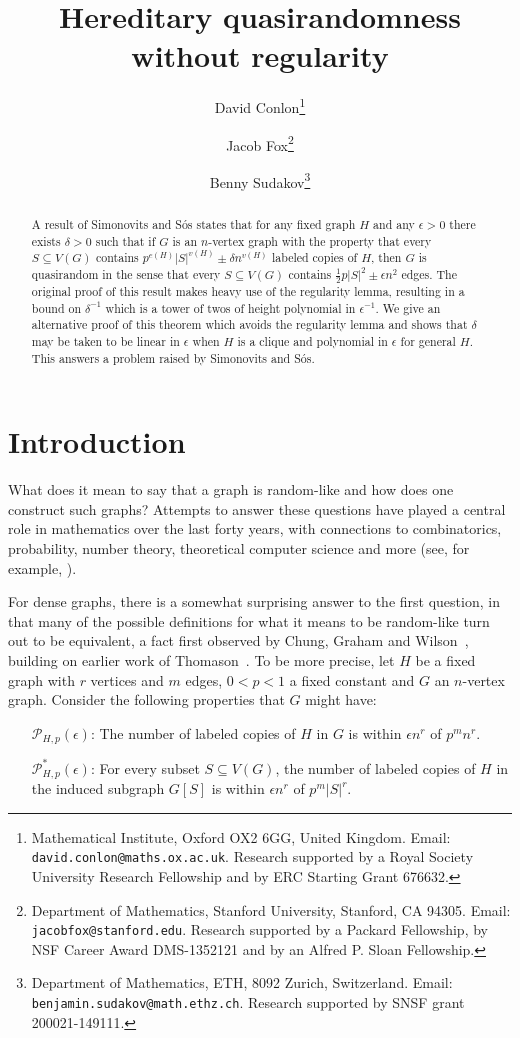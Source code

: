 \documentclass[11pt]{article}
\title{\vspace{-0.7cm}Hereditary quasirandomness without regularity}
\author{David Conlon\thanks{Mathematical Institute, Oxford OX2 6GG,
United Kingdom. Email: {\tt david.conlon@maths.ox.ac.uk}. Research
supported by a Royal Society University Research Fellowship and by ERC Starting Grant 676632.}\and
Jacob Fox\thanks{Department of Mathematics, Stanford University, Stanford, CA 94305. Email: {\tt jacobfox@stanford.edu}. Research supported by a Packard Fellowship, by NSF Career Award DMS-1352121 and by an Alfred P. Sloan Fellowship.}
\and
Benny Sudakov\thanks{Department of Mathematics, ETH, 8092 Zurich, Switzerland.
Email: {\tt benjamin.sudakov@math.ethz.ch}. Research supported by SNSF grant 200021-149111.}}
\date{}
\begin{document}
\maketitle

\begin{abstract}
A result of Simonovits and S\'os states that for any fixed graph $H$ and any $\epsilon > 0$ there exists $\delta > 0$ such that if $G$ is an $n$-vertex graph with the property that every $S \subseteq V(G)$ contains $p^{e(H)} |S|^{v(H)} \pm \delta n^{v(H)}$ labeled copies of $H$, then $G$ is quasirandom in the sense that every $S \subseteq V(G)$ contains $\frac{1}{2} p |S|^2 \pm \epsilon n^2$ edges. The original proof of this result makes heavy use of the regularity lemma, resulting in a bound on $\delta^{-1}$ which is a tower of twos of height polynomial in $\epsilon^{-1}$. We give an alternative proof of this theorem which avoids the regularity lemma and shows that $\delta$ may be taken to be linear in $\epsilon$ when $H$ is a clique and polynomial in $\epsilon$ for general $H$. This answers a problem raised by Simonovits and S\'os.
\end{abstract}

\section{Introduction}

What does it mean to say that a graph is random-like and how does one construct such graphs? Attempts to answer these questions have played a central role in mathematics over the last forty years, with connections to combinatorics, probability, number theory, theoretical computer science and more (see, for example, \cite{HLW06, KS06}).

For dense graphs, there is a somewhat surprising answer to the first question, in that many of the possible definitions for what it means to be random-like turn out to be equivalent, a fact first observed by Chung, Graham and Wilson~\cite{CGW}, building on earlier work of Thomason~\cite{Th, Th2}. To be more precise, let $H$ be a fixed graph with $r$ vertices and $m$ edges, $0 < p < 1$ a fixed constant and $G$ an $n$-vertex graph. Consider the following properties that $G$ might have:

\begin{enumerate}[leftmargin=1.8cm]

\item[$\mathcal{P}_{H,p}(\epsilon)$:] 
The number of labeled copies of $H$ in $G$ is within $\epsilon n^r$ of $p^m n^r$.

\item[$\mathcal{P}_{H,p}^*(\epsilon)$:] 
For every subset $S \subseteq V(G)$, the number of labeled copies of $H$ in the induced subgraph $G[S]$
is within $\epsilon n^r$ of $p^m |S|^r$.

\end{enumerate}
\end{document}
